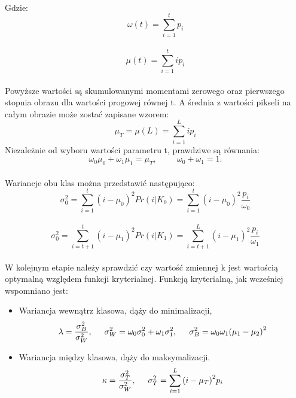 \documentclass[eng,oneside]{mgr}
\begin{document}
\\
\hspace{1cm} Gdzie:
\\
\begin{equation}
\omega(t)=\sum_{i=1}^t p_i
\end{equation}
\
\begin{equation}
\mu(t)=\sum_{i=1}^t ip_i
\end{equation}
\\
\hspace{1cm} Powyższe wartości są skumulowanymi momentami zerowego oraz pierwszego stopnia obrazu dla wartości progowej równej t. A średnia z wartości pikseli na całym obrazie może zostać zapisane wzorem:
\\
\begin{equation}
\mu_T = \mu(L) = \sum_{i=1}^L ip_i
\end{equation}
\hspace{1cm} Niezależnie od wyboru wartości parametru t, prawdziwe są równania:
\\
\begin{equation}
\omega_0\mu_0+\omega_1\mu_1=\mu_T, \hspace{1cm} \omega_0+\omega_1=1. 
\end{equation}
\\
\hspace{1cm} Wariancje obu klas można przedstawić następująco:
\\
\begin{equation}
\sigma_0^{2}=\sum_{i=1}^t {(i-\mu_0)}^2 Pr(i|K_0)=\sum_{i=1}^t {(i-\mu_0)}^2 \frac{p_i}{\omega_0}
\end{equation}
\
\begin{equation}
\sigma_0^{2}=\sum_{i=t+1}^t {(i-\mu_1)}^2 Pr(i|K_1)=\sum_{i=t+1}^L {(i-\mu_1)}^2 \frac{p_i}{\omega_1}
\end{equation}
\\
\hspace{1cm} W kolejnym etapie należy sprawdzić czy wartość zmiennej k jest wartością optymalną względem funkcji kryterialnej. Funkcją kryterialną, jak wcześniej wspomniano jest:
\begin{itemize}
\item Wariancja wewnątrz klasowa, dąży do minimalizacji,
\begin{equation}
\lambda=\frac{\sigma_B^2}{\sigma_W^2}, \hspace{0.5cm} \sigma_W^2 = \omega_0\sigma_0^2 + \omega_1\sigma_1^2, \hspace{0.5cm} \sigma_B^2 = \omega_0\omega_1{(\mu_1-\mu_2)}^2 
\end{equation}
\item Wariancja między klasowa, dąży do maksymalizacji.
\begin{equation}
\kappa=\frac{\sigma_T^2}{\sigma_W^2}, \hspace{0.5cm} \sigma_T^2 = \sum_{i=1}^L {(i-\mu_T)}^2 p_i 
\end{equation}
\end{itemize}
\end{document}
